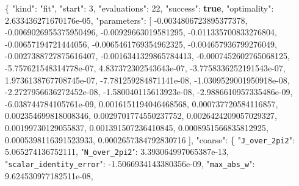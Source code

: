 \documentclass[
  10pt,
]{article}
\newenvironment{Shaded}{}{}
\newcommand{\DataTypeTok}[1]{\textcolor[rgb]{0.56,0.13,0.00}{#1}}
\newcommand{\DecValTok}[1]{\textcolor[rgb]{0.25,0.63,0.44}{#1}}
\newcommand{\FloatTok}[1]{\textcolor[rgb]{0.25,0.63,0.44}{#1}}
\newcommand{\FunctionTok}[1]{\textcolor[rgb]{0.02,0.16,0.49}{#1}}
\newcommand{\KeywordTok}[1]{\textcolor[rgb]{0.00,0.44,0.13}{\textbf{#1}}}
\newcommand{\OtherTok}[1]{\textcolor[rgb]{0.00,0.44,0.13}{#1}}
\newcommand{\StringTok}[1]{\textcolor[rgb]{0.25,0.44,0.63}{#1}}
\begin{document}
\begin{Shaded}
\begin{Highlighting}[]
\FunctionTok{\{}
  \DataTypeTok{"kind"}\FunctionTok{:} \StringTok{"fit"}\FunctionTok{,}
  \DataTypeTok{"start"}\FunctionTok{:} \DecValTok{3}\FunctionTok{,}
  \DataTypeTok{"evaluations"}\FunctionTok{:} \DecValTok{22}\FunctionTok{,}
  \DataTypeTok{"success"}\FunctionTok{:} \KeywordTok{true}\FunctionTok{,}
  \DataTypeTok{"optimality"}\FunctionTok{:} \FloatTok{2.633436271670176e{-}05}\FunctionTok{,}
  \DataTypeTok{"parameters"}\FunctionTok{:} \OtherTok{[}
    \FloatTok{{-}0.0034806723895377378}\OtherTok{,}
    \FloatTok{{-}0.0069026955375950496}\OtherTok{,}
    \FloatTok{{-}0.00929663019581295}\OtherTok{,}
    \FloatTok{{-}0.011335700833276804}\OtherTok{,}
    \FloatTok{{-}0.00657194721444056}\OtherTok{,}
    \FloatTok{{-}0.0065461769354962325}\OtherTok{,}
    \FloatTok{{-}0.004657936799276049}\OtherTok{,}
    \FloatTok{{-}0.0027388727875616407}\OtherTok{,}
    \FloatTok{{-}0.0016341329865784413}\OtherTok{,}
    \FloatTok{{-}0.0007452602765068125}\OtherTok{,}
    \FloatTok{{-}5.757621548314778e{-}07}\OtherTok{,}
    \FloatTok{4.837372302543643e{-}07}\OtherTok{,}
    \FloatTok{{-}3.7758336252191543e{-}07}\OtherTok{,}
    \FloatTok{1.9736138767708745e{-}07}\OtherTok{,}
    \FloatTok{{-}7.781259284871141e{-}08}\OtherTok{,}
    \FloatTok{{-}1.0309529001950918e{-}08}\OtherTok{,}
    \FloatTok{{-}2.2727956636272452e{-}08}\OtherTok{,}
    \FloatTok{{-}1.580040115613923e{-}08}\OtherTok{,}
    \FloatTok{{-}2.9886610957335486e{-}09}\OtherTok{,}
    \FloatTok{{-}6.038744784105761e{-}09}\OtherTok{,}
    \FloatTok{0.0016151194046468568}\OtherTok{,}
    \FloatTok{0.000737720584116857}\OtherTok{,}
    \FloatTok{0.002354699818008346}\OtherTok{,}
    \FloatTok{0.0029701774550237752}\OtherTok{,}
    \FloatTok{0.0026424209057029327}\OtherTok{,}
    \FloatTok{0.00199730129055837}\OtherTok{,}
    \FloatTok{0.001391507236410845}\OtherTok{,}
    \FloatTok{0.0008951566835812925}\OtherTok{,}
    \FloatTok{0.0005398116391523933}\OtherTok{,}
    \FloatTok{0.0002657384792830716}
  \OtherTok{]}\FunctionTok{,}
  \DataTypeTok{"coarse"}\FunctionTok{:} \FunctionTok{\{}
    \DataTypeTok{"\nolinkurl{J_over_2pi2}"}\FunctionTok{:} \FloatTok{5.065274136752111}\FunctionTok{,}
    \DataTypeTok{"\nolinkurl{N_over_2pi2}"}\FunctionTok{:} \FloatTok{3.393064997065387e{-}13}\FunctionTok{,}
    \DataTypeTok{"\nolinkurl{scalar_identity_error}"}\FunctionTok{:} \FloatTok{{-}1.5066934143380356e{-}09}\FunctionTok{,}
    \DataTypeTok{"\nolinkurl{max_abs_w}"}\FunctionTok{:} \FloatTok{9.624530977182511e{-}08}\FunctionTok{,}

\end{Highlighting}
\end{Shaded}
\end{document}

